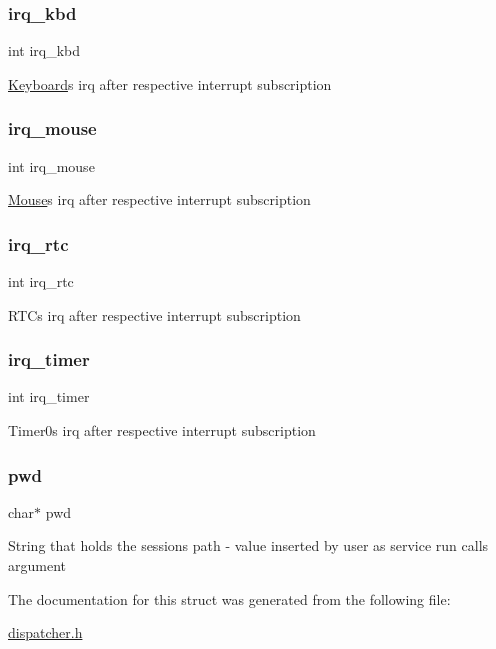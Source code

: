 \subsubsection{\texorpdfstring{irq\+\_\+kbd}{irq\_kbd}}
{\footnotesize\ttfamily int irq\+\_\+kbd}

\hyperlink{struct_keyboard}{Keyboard}\textquotesingle{}s irq after respective interrupt subscription \hypertarget{struct_dispatcher_a899f4e59ee15429018efee9d38b533f1}{}\label{struct_dispatcher_a899f4e59ee15429018efee9d38b533f1} 
\subsubsection{\texorpdfstring{irq\+\_\+mouse}{irq\_mouse}}
{\footnotesize\ttfamily int irq\+\_\+mouse}

\hyperlink{struct_mouse}{Mouse}\textquotesingle{}s irq after respective interrupt subscription \hypertarget{struct_dispatcher_ac41513eff21d0a1e7c633f653c81eb0e}{}\label{struct_dispatcher_ac41513eff21d0a1e7c633f653c81eb0e} 
\subsubsection{\texorpdfstring{irq\+\_\+rtc}{irq\_rtc}}
{\footnotesize\ttfamily int irq\+\_\+rtc}

R\+TC\textquotesingle{}s irq after respective interrupt subscription \hypertarget{struct_dispatcher_a1d02e668b2cd1d4d633b562f437b8a4c}{}\label{struct_dispatcher_a1d02e668b2cd1d4d633b562f437b8a4c} 
\subsubsection{\texorpdfstring{irq\+\_\+timer}{irq\_timer}}
{\footnotesize\ttfamily int irq\+\_\+timer}

Timer0\textquotesingle{}s irq after respective interrupt subscription \hypertarget{struct_dispatcher_a4be832ac49cb1384b79b9423028f1d54}{}\label{struct_dispatcher_a4be832ac49cb1384b79b9423028f1d54} 
\subsubsection{\texorpdfstring{pwd}{pwd}}
{\footnotesize\ttfamily char$\ast$ pwd}

String that holds the session\textquotesingle{}s path -\/ value inserted by user as service run call\textquotesingle{}s argument 

The documentation for this struct was generated from the following file\+:\begin{DoxyCompactItemize}
\item 
\hyperlink{dispatcher_8h}{dispatcher.\+h}\end{DoxyCompactItemize}
